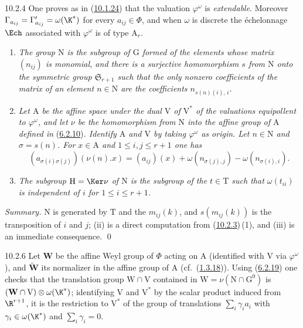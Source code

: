 \documentclass[12pt,a4paper,oneside,english]{smfart}
\makeatletter
\newcommand{\btanchor}[1]{\leavevmode\Hy@raisedlink{\hypertarget{bt:#1}{}}}
\newcommand{\btref}[1]{\hyperlink{bt:#1}{#1}}
\theoremstyle{definition}
\theoremstyle{bt}
\makeatother
\begin{document}
\num{10.2.4}\btanchor{10.2.4} One proves as in (\btref{10.1.24}) that the valuation $\varphi^{\omega}$ is
\emph{extendable}. Moreover $\Gamma_{a_{ij}}=\Gamma'_{a_{ij}}=\omega(\K^{*})$
for every $a_{ij}\in\Phi$, and when $\omega$ is discrete the échelonnage $\Ech$
associated with $\varphi^{\omega}$ is of type $\mathrm{A}_r$.

\btanchor{10.2.5}
\begin{enumerate}[label=(\roman*),leftmargin=2.5em]
\item \emph{The group $\mathrm{N}$ is the subgroup of $\mathrm{G}$ formed of the
elements whose matrix $(n_{ij})$ is monomial, and there is a surjective
homomorphism $s$ from $\mathrm{N}$ onto the symmetric group $\mathfrak{S}_{r+1}$
such that the only nonzero coefficients of the matrix of an element
$n\in\mathrm{N}$ are the coefficients $n_{s(n)(i),\,i}$.}
\item \emph{Let $\mathrm{A}$ be the affine space under the dual $\mathrm{V}$ of
$\mathrm{V}^{*}$ of the valuations equipollent to $\varphi^{\omega}$, and let
$\nu$ be the homomorphism from $\mathrm{N}$ into the affine group of
$\mathrm{A}$ defined in} (\btref{6.2.10})\emph{. Identify $\mathrm{A}$ and $\mathrm{V}$
by taking $\varphi^{\omega}$ as origin. Let $n\in\mathrm{N}$ and $\sigma=s(n)$.
For $x\in\mathrm{A}$ and $1\leqslant i,j\leqslant r+1$ one has}
\[
(a_{\sigma(i)\sigma(j)})(\nu(n).x)=(a_{ij})(x)+\omega(n_{\sigma(j),j})-\omega(n_{\sigma(i),i}).
\]
\item \emph{The subgroup $\mathrm{H}=\Ker\nu$ of $\mathrm{N}$ is the subgroup of
the $t\in\mathrm{T}$ such that $\omega(t_{ii})$ is independent of $i$ for
$1\leqslant i\leqslant r+1$.}
\end{enumerate}

\pf
\emph{Summary.} $\mathrm{N}$ is generated by $\mathrm{T}$ and the $m_{ij}(k)$,
and $s(m_{ij}(k))$ is the transposition of $i$ and $j$; (ii) is a direct
computation from (\btref{10.2.3})\,(1), and (iii) is an immediate consequence. \qed

\num{10.2.6}\btanchor{10.2.6} Let $\mathbf{W}$ be the affine Weyl group of $\Phi$ acting on
$\mathrm{A}$ (identified with $\mathrm{V}$ via $\varphi^{\omega}$), and
$\widetilde{\mathbf{W}}$ its normalizer in the affine group of $\mathrm{A}$
(cf.~(\btref{1.3.18})). Using (\btref{6.2.19}) one checks that the translation group
$\mathrm{W}\cap\mathrm{V}$ contained in
$\mathrm{W}=\nu(\mathrm{N}\cap\mathrm{G}^{0})$ is
$(\mathbf{W}\cap\mathrm{V})\otimes\omega(\K^{*})$; identifying $\mathrm{V}$ and
$\mathrm{V}^{*}$ by the scalar product induced from $\R^{r+1}$, it is the
restriction to $\mathrm{V}^{*}$ of the group of translations
$\sum_i\gamma_i a_i$ with $\gamma_i\in\omega(\K^{*})$ and $\sum_i\gamma_i=0$.
\end{document}

